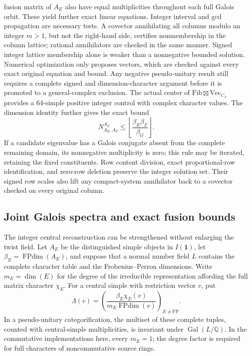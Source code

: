 fusion matrix of $A_E$ also have equal multiplicities throughout each full
Galois orbit. These yield further exact linear equations. Integer interval
and gcd propagation are necessary tests. A covector annihilating all columns
modulo an integer $m>1$, but not the right-hand side, certifies nonmembership
in the column lattice; rational annihilators are checked in the same manner.
Signed integer lattice membership alone is weaker than a nonnegative
bounded solution. Numerical optimization only proposes vectors, which are
checked against every exact original equation and bound. Any negative
pseudo-unitary result still requires a complete signed and dimension-character
argument before it is promoted to a general-complex exclusion.
The actual center of $\mathrm{Fib}\boxtimes\mathrm{Vec}_{C_4}$ provides a
64-simple positive integer control with complex character values.
The dimension identity further gives the exact bound
\[
 N_{A_E,A_F}^{A_G}\leq
 \left\lfloor\frac{\beta_E\beta_F}{\beta_G}\right\rfloor.
\]
If a candidate eigenvalue has a Galois conjugate absent from the complete
remaining domain, its nonnegative multiplicity is zero; this rule may be
iterated, retaining the fixed constituents. Row content division, exact
proportional-row identification, and zero-row deletion preserve the integer
solution set. Their signed row scales also lift any compact-system
annihilator back to a covector checked on every original column.

\subsection{Joint Galois spectra and exact fusion bounds}

The integer central reconstruction can be strengthened without enlarging
the twist field.  Let $A_E$ be the distinguished simple objects in
$I(\mathbf1)$, let $\beta_E=\operatorname{FPdim}(A_E)$, and suppose that
a normal number field $L$ contains the complete character table and the
Frobenius--Perron dimensions.  Write $m_E=\dim(E)$ for the degree of the
irreducible representation affording the full matrix character $\chi_E$.
For a central simple with restriction vector $v$, put
\[
 \Lambda(v)=\left(
 \frac{\beta_E\chi_E(v)}{m_E\operatorname{FPdim}(v)}
 \right)_{E\ne\mathrm{FP}}.
\]
In a pseudo-unitary categorification, the multiset of these complete
tuples, counted with central-simple multiplicities, is invariant under
$\operatorname{Gal}(L/\mathbb Q)$.  In the commutative implementations
here, every $m_E=1$; the degree factor is required for full characters
of noncommutative source rings.


